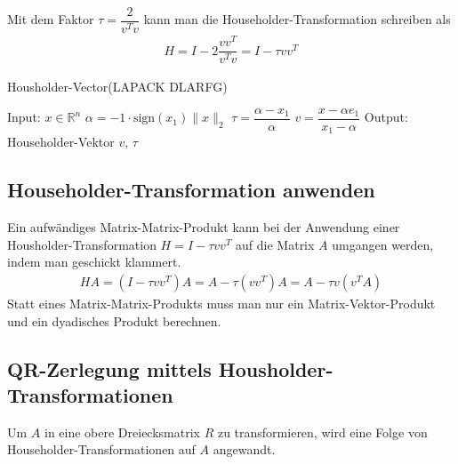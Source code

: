 Mit dem Faktor $\tau = \dfrac{2}{v^Tv}$ kann man die Householder-Transformation schreiben als
\begin{align*}
	H = I - 2 \dfrac{vv^T}{v^Tv} = I - \tau v v^T
\end{align*}



\begin{algorithm}
	\caption{Housholder-Vector(LAPACK DLARFG)}
	\begin{algorithmic}
		\State Input: $x \in \mathbb{R}^n$ \bigskip
		\State $\alpha = -1 \cdot \text{sign}(x_1) \|x\|_2$
		\State $\tau = \dfrac{\alpha - x_1}{\alpha}$
		\State $v=\dfrac{x - \alpha e_1}{x_1 - \alpha}$ \bigskip
		\State Output: Householder-Vektor $v$, $\tau$
	\end{algorithmic} 
	\label{alg:unblockedqr}
\end{algorithm}


\subsection{Householder-Transformation anwenden} \label{sec:appHHvec}
Ein aufwändiges Matrix-Matrix-Produkt kann bei der Anwendung einer Housholder-Transformation $H = I - \tau vv^T$ auf die Matrix $A$ umgangen werden, indem man geschickt klammert.
\begin{align*} 
H A =(I - \tau vv^T) A= A - \tau (vv^T )A = A - \tau v(v^TA)
\end{align*}
Statt eines Matrix-Matrix-Produkts muss man nur ein Matrix-Vektor-Produkt und ein dyadisches Produkt berechnen.

\subsection{QR-Zerlegung mittels Housholder-Transformationen}
Um $A$ in eine obere Dreiecksmatrix $R$ zu transformieren, wird eine Folge von Householder-Transformationen auf $A$ angewandt.


